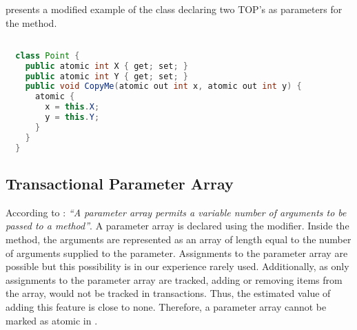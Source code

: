  presents a modified example of the  class declaring two \ac{TOP}'s as parameters for the  method.

\begin{lstlisting}[label=lst:atomic_out,
 caption={Transactional Output Parameter},
 language=Java, 
 showspaces=false,
 showtabs=false,
 breaklines=true,
 showstringspaces=false,
 breakatwhitespace=true,
 commentstyle=\color{greencomments},
 keywordstyle=\color{bluekeywords},
 stringstyle=\color{redstrings},
 morekeywords={atomic, retry, orElse, var, get, set, ref, out}]  % Start your code-block

  class Point {
    public atomic int X { get; set; }
    public atomic int Y { get; set; }
    public void CopyMe(atomic out int x, atomic out int y) {
      atomic {
        x = this.X;
        y = this.Y;
      }
    }   
  }
\end{lstlisting}

\subsection{Transactional Parameter Array}\label{sec:stm_design_paramter_array}
According to \cite[p. 17]{csharp2013specificaiton}: \textit{``A parameter array permits a variable number of arguments to be passed to a method''}. A parameter array is declared using the  modifier. Inside the method, the arguments are represented as an array of length equal to the number of arguments supplied to the  parameter. Assignments to the parameter array are possible but this possibility is in our experience rarely used. Additionally, as only assignments to the parameter array are tracked, adding or removing items from the array, would not be tracked in transactions. Thus, the estimated value of adding this feature is close to none. Therefore, a parameter array cannot be marked as atomic in \stmname.

